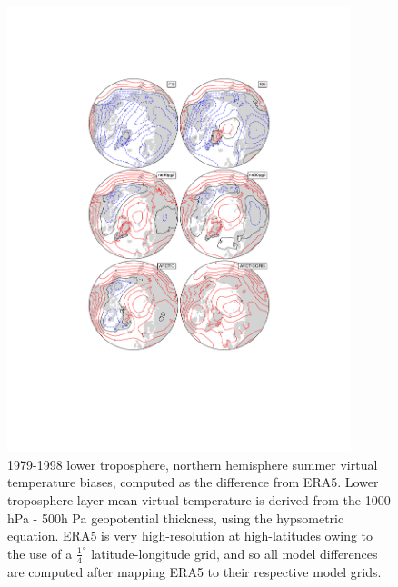 \documentclass[draft]{agujournal2019}
\begin{document}
\begin{figure}[t]
\begin{center}
         \includegraphics[width=100mm]{figs/temp_contours_diffERA5_Thyps.pdf}
\end{center}
\caption{1979-1998 lower troposphere, northern hemisphere summer virtual temperature biases, computed as the difference from ERA5. Lower troposphere layer mean virtual temperature is derived from the 1000 hPa - 500h Pa geopotential thickness, using the hypsometric equation. ERA5 is very high-resolution at high-latitudes owing to the use of a $\frac{1}{4}^{\circ}$ latitude-longitude grid, and so all model differences are computed after mapping ERA5 to their respective model grids.}
\label{fig:dThyps}
\end{figure}
\end{document}
